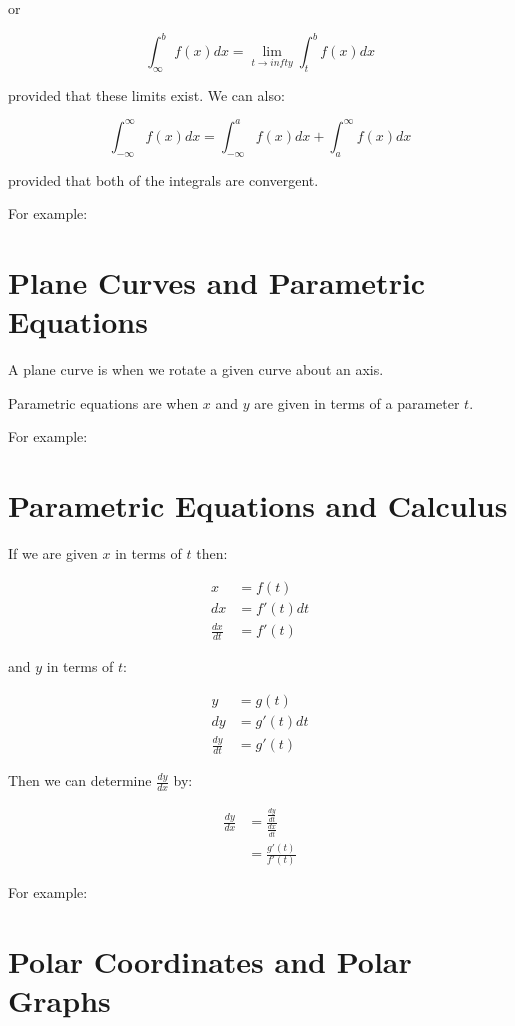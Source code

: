 \documentclass{article}
\begin{document}
or

\[
\int^b_\infty f(x)dx = \lim_{t \to infty} \int^b_t f(x)dx
\]

provided that these limits exist.  We can also:

\[
\int^\infty_{-\infty} f(x)dx = \int^a_{-\infty}f(x)dx + \int^\infty_a f(x)dx
\]

provided that both of the integrals are convergent.

For example:

\section{Plane Curves and Parametric Equations}

A plane curve is when we rotate a given curve about an axis.

Parametric equations are when $x$ and $y$ are given in terms of a parameter $t$.

For example:

\section{Parametric Equations and Calculus}

If we are given $x$ in terms of $t$ then:

\begin{align*}
  x &= f(t) \\
  dx &= f'(t)dt \\
  \frac{dx}{dt} &= f'(t)
\end{align*}

and $y$ in terms of $t$:

\begin{align*}
  y &= g(t) \\
  dy &= g'(t)dt \\
  \frac{dy}{dt} &= g'(t)
\end{align*}

Then we can determine $\frac{dy}{dx}$ by:

\begin{align*}
  \frac{dy}{dx} &= \frac{ \frac{dy}{dt} }{ \frac{dx}{dt} } \\
  &= \frac{g'(t)}{f'(t)}
\end{align*}

For example:

\section{Polar Coordinates and Polar Graphs}
\end{document}
